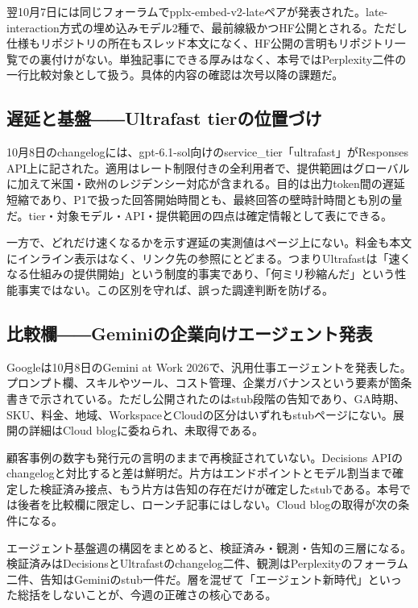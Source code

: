 翌10月7日には同じフォーラムでpplx-embed-v2-lateペアが発表された。late-interaction方式の埋め込みモデル2種で、最前線級かつHF公開とされる。ただし仕様もリポジトリの所在もスレッド本文になく、HF公開の言明もリポジトリ一覧での裏付けがない。単独記事にできる厚みはなく、本号ではPerplexity二件の一行比較対象として扱う。具体的内容の確認は次号以降の課題だ。\cite{pplxembed}

\subsection*{遅延と基盤――Ultrafast tierの位置づけ}

10月8日のchangelogには、gpt-6.1-sol向けのservice\_tier「ultrafast」がResponses API上に記された。適用はレート制限付きの全利用者で、提供範囲はグローバルに加えて米国・欧州のレジデンシー対応が含まれる。目的は出力token間の遅延短縮であり、P1で扱った回答開始時間とも、最終回答の壁時計時間とも別の量だ。tier・対象モデル・API・提供範囲の四点は確定情報として表にできる。\cite{ultrafast}

一方で、どれだけ速くなるかを示す遅延の実測値はページ上にない。料金も本文にインライン表示はなく、リンク先の参照にとどまる。つまりUltrafastは「速くなる仕組みの提供開始」という制度的事実であり、「何ミリ秒縮んだ」という性能事実ではない。この区別を守れば、誤った調達判断を防げる。\cite{ultrafast}

\subsection*{比較欄――Geminiの企業向けエージェント発表}

Googleは10月8日のGemini at Work 2026で、汎用仕事エージェントを発表した。プロンプト欄、スキルやツール、コスト管理、企業ガバナンスという要素が箇条書きで示されている。ただし公開されたのはstub段階の告知であり、GA時期、SKU、料金、地域、WorkspaceとCloudの区分はいずれもstubページにない。展開の詳細はCloud blogに委ねられ、未取得である。\cite{geminiagent}

顧客事例の数字も発行元の言明のままで再検証されていない。Decisions APIのchangelogと対比すると差は鮮明だ。片方はエンドポイントとモデル割当まで確定した検証済み接点、もう片方は告知の存在だけが確定したstubである。本号では後者を比較欄に限定し、ローンチ記事にはしない。Cloud blogの取得が次の条件になる。\cite{geminiagent}

エージェント基盤週の構図をまとめると、検証済み・観測・告知の三層になる。検証済みはDecisionsとUltrafastのchangelog二件、観測はPerplexityのフォーラム二件、告知はGeminiのstub一件だ。層を混ぜて「エージェント新時代」といった総括をしないことが、今週の正確さの核心である。\cite{decisions}\cite{ultrafast}

